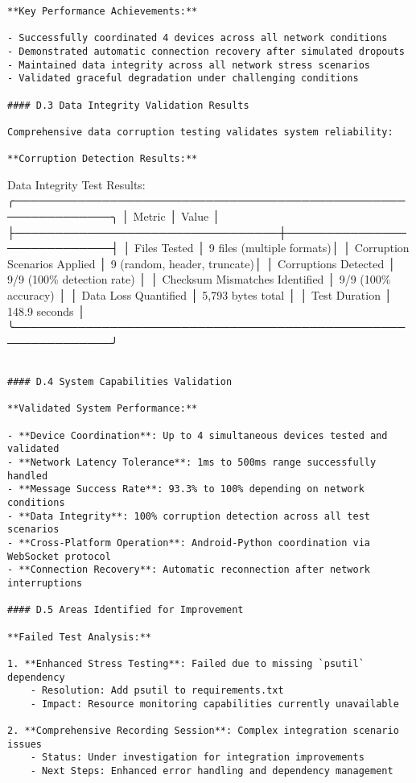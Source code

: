 \documentclass[11pt,a4paper]{report}
\begin{document}
{{\begin{verbatim}
**Key Performance Achievements:**

- Successfully coordinated 4 devices across all network conditions
- Demonstrated automatic connection recovery after simulated dropouts
- Maintained data integrity across all network stress scenarios
- Validated graceful degradation under challenging conditions

#### D.3 Data Integrity Validation Results

Comprehensive data corruption testing validates system reliability:

**Corruption Detection Results:**

\end{verbatim}
Data Integrity Test Results:
╭──────────────────────────────────────────────────────────────╮
│ Metric                          │ Value                      │
├─────────────────────────────────┼────────────────────────────┤
│ Files Tested                    │ 9 files (multiple formats)│
│ Corruption Scenarios Applied    │ 9 (random, header, truncate)│
│ Corruptions Detected           │ 9/9 (100\% detection rate) │
│ Checksum Mismatches Identified │ 9/9 (100\% accuracy)       │
│ Data Loss Quantified           │ 5,793 bytes total          │
│ Test Duration                   │ 148.9 seconds             │
╰──────────────────────────────────────────────────────────────╯
\begin{verbatim}

#### D.4 System Capabilities Validation

**Validated System Performance:**

- **Device Coordination**: Up to 4 simultaneous devices tested and validated
- **Network Latency Tolerance**: 1ms to 500ms range successfully handled
- **Message Success Rate**: 93.3% to 100% depending on network conditions
- **Data Integrity**: 100% corruption detection across all test scenarios
- **Cross-Platform Operation**: Android-Python coordination via WebSocket protocol
- **Connection Recovery**: Automatic reconnection after network interruptions

#### D.5 Areas Identified for Improvement

**Failed Test Analysis:**

1. **Enhanced Stress Testing**: Failed due to missing `psutil` dependency
    - Resolution: Add psutil to requirements.txt
    - Impact: Resource monitoring capabilities currently unavailable

2. **Comprehensive Recording Session**: Complex integration scenario issues
    - Status: Under investigation for integration improvements
    - Next Steps: Enhanced error handling and dependency management


\end{verbatim}}}
\end{document}
